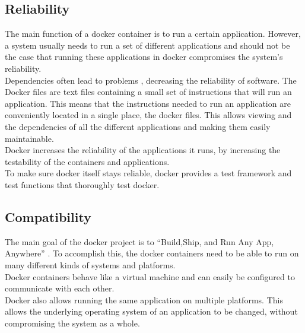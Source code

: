 \subsection{Reliability}
The main function of a docker container is to run a certain application. However, a system usually needs to run a set of different applications and should not be the case that running these applications in docker compromises the system's reliability.\\
Dependencies often lead to problems \cite{dockerrepo}, decreasing the reliability of software. The Docker files are text files containing a small set of instructions that will run an application. This means that the instructions needed to run an application are conveniently located in a single place, the docker files. This  allows viewing and the dependencies of all the different applications and making them easily maintainable.\\
Docker increases the reliability of the applications it runs, by increasing the testability of the containers and applications.\\
To make sure docker itself stays reliable, docker provides a test framework and test functions that thoroughly test docker.\\
%


\subsection{Compatibility}
The main goal of the docker project is to ``Build,Ship, and Run Any App, Anywhere'' \cite{dockermain}. To accomplish this, the docker containers need to be able to run on many different kinds of systems and platforms.\\
Docker containers behave like a virtual machine and can easily be configured to communicate with each other.\\
Docker also allows running the same application on multiple platforms. This allows the underlying operating system of an application to be changed, without compromising the system as a whole.
